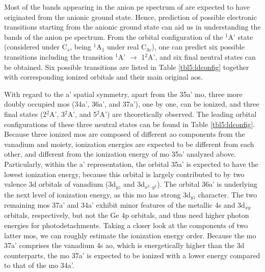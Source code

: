 \begin{refsection}
Most of the bands appearing in the anion \acrshort{pe} spectrum of  are expected to have originated from the anionic ground state. Hence, prediction of possible electronic transitions starting from the anionic ground state can aid us in understanding the bands of the anion \acrshort{pe} spectrum. From the orbital configuration of the $^1$A' state (considered under C$_s$, being $^1$A$_1$ under real C$_{3v}$), one can predict six possible transitions including the transition $^1$A' $\longrightarrow$ 1$^2$A', and six final neutral states can be obtained. Six possible transitions are listed in Table \ref{tbl5:ldconfig} together with corresponding ionized orbitals and their main original \acrshort{ao}s.




With regard to the a' spatial symmetry, apart from the 35a' \acrshort{mo}, three more doubly occupied \acrshort{mo}s (34a', 36a', and 37a'), one by one, can be ionized, and three final states (2$^2$A', 3$^2$A', and 5$^2$A') are theoretically observed. The leading orbital configurations of these three neutral states can be found in Table \ref{tbl5:ldconfig}. Because three ionized \acrshort{mo}s are composed of different \acrshort{ao} components from the vanadium and  moiety, ionization energies are expected to be different from each other, and different from the ionization energy of \acrshort{mo} 35a' analyzed above. Particularly, within the a' representation, the orbital 35a' is expected to have the lowest ionization energy, because this orbital is largely contributed to by two valence 3d orbitals of vanadium (3d$_{yz}$ and 3d$_{x^2–y^2}$). The orbital 36a' is underlying the next level of ionization energy, as this \acrshort{mo} has strong 3d$_{yz}$ character. The two remaining \acrshort{mo}s 37a' and 34a' exhibit minor features of the metallic 4s and 3d$_{xy}$ orbitals, respectively, but not the Ge 4p orbitals, and thus need higher photon energies for photodetachments. Taking a closer look at the components of two latter \acrshort{mo}s, we can roughly estimate the ionization energy order. Because the \acrshort{mo} 37a' comprises the vanadium 4s \acrshort{ao}, which is energetically higher than the 3d counterparts, the \acrshort{mo} 37a' is expected to be ionized with a lower energy compared to that of the \acrshort{mo} 34a'.







\end{refsection}
